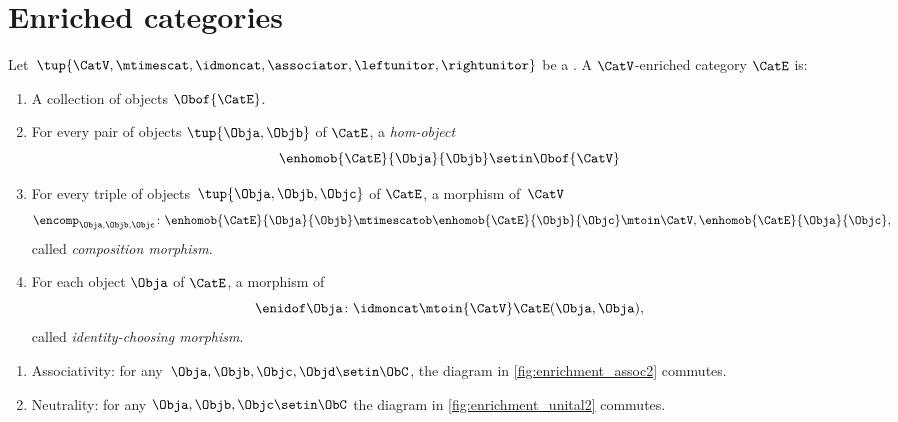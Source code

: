 
\section{Enriched categories}
\label{sec:enrichment-enriched-categories}

\begin{ctdefinition}
    \label{def:enriched_cat}
    Let~$\tup{\CatV, \mtimescat, \idmoncat, \associator, \leftunitor, \rightunitor}$ be a .
    A $\CatV$-enriched category $\CatE$ is:
    
    \constit
    \begin{enumerate}
    \item A collection of objects $\Obof{\CatE}$.
    \item For every pair of objects $\tup{\Obja, \Objb}$ of $\CatE$, a \emph{hom-object}
             \begin{equation}
                  \enhomob{\CatE}{\Obja}{\Objb} \setin \Obof{\CatV}
              \end{equation}
        \item For every triple of objects~$\tup{\Obja, \Objb, \Objc}$ of $\CatE$, a morphism of~$\CatV$
              \begin{equation}
                  \encomp_{\Obja,\Objb,\Objc}\colon \enhomob{\CatE}{\Obja}{\Objb} \mtimescatob \enhomob{\CatE}{\Objb}{\Objc} \mtoin\CatV, \enhomob{\CatE}{\Obja}{\Objc},
              \end{equation}
            called \emph{composition morphism}.
        \item For each object $\Obja$ of $\CatE$, a morphism of~\CatV
              \begin{equation}
                  \enidof\Obja \colon \idmoncat \mtoin{\CatV} \CatE(\Obja,\Obja),
              \end{equation}
              called \emph{identity-choosing morphism}.
               \end{enumerate}
               
               \condit
             \begin{enumerate}
\item Associativity: for any~$\Obja,\Objb,\Objc,\Objd\setin \ObC$, the diagram in \cref{fig:enrichment_assoc2} commutes.
\item Neutrality: for any $\Obja,\Objb,\Objc \setin \ObC$ the diagram in \cref{fig:enrichment_unital2} commutes.
\end{enumerate}
\end{ctdefinition}


